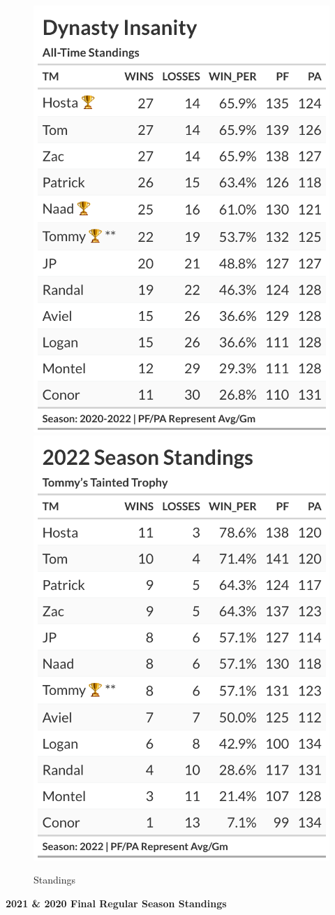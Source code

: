 \documentclass[
]{article}
\begin{document}
\begin{figure}

{\centering \includegraphics[width=0.5\linewidth,height=0.5\textheight]{output/history/all_time_standings} \includegraphics[width=0.5\linewidth,height=0.5\textheight]{output/history/2022_standings} 

}

\caption{Standings}\label{fig:unnamed-chunk-2}
\end{figure}
\newpage

\textbf{2021 \& 2020 Final Regular Season Standings}
\end{document}
